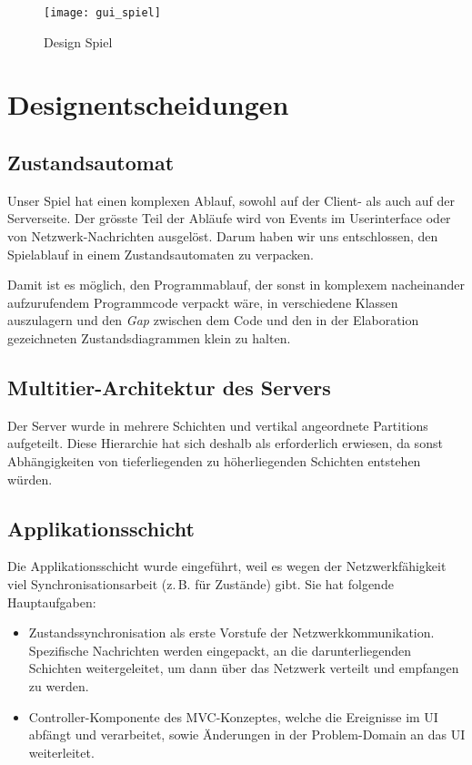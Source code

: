 \documentclass[12pt,halfparskip]{scrartcl}
\begin{document}
\begin{figure}[h]
	\centering
	\texttt{[image: gui\_spiel]}
	\caption{Design Spiel}
	\label{fig:gui_spiel}
\end{figure}


\clearpage
\section{Designentscheidungen}

\subsection{Zustandsautomat}
Unser Spiel hat einen komplexen Ablauf, sowohl auf der Client- als auch auf der Serverseite. Der grösste Teil der Abläufe wird von Events im Userinterface oder von Netzwerk-Nachrichten ausgelöst. Darum haben wir uns entschlossen, den Spielablauf in einem Zustandsautomaten zu verpacken.

Damit ist es möglich, den Programmablauf, der sonst in komplexem nacheinander aufzurufendem Programmcode verpackt wäre, in verschiedene Klassen auszulagern und den \emph{Gap} zwischen dem Code und den in der Elaboration gezeichneten Zustandsdiagrammen klein zu halten.

\subsection{Multitier-Architektur des Servers}
Der Server wurde in mehrere Schichten und vertikal angeordnete Partitions aufgeteilt. Diese Hierarchie hat sich deshalb als erforderlich erwiesen, da sonst Abhängigkeiten von tieferliegenden zu höherliegenden Schichten entstehen würden.

\subsection{Applikationsschicht}
Die Applikationsschicht wurde eingeführt, weil es wegen der Netzwerkfähigkeit viel Synchronisationsarbeit (z.\,B. für Zustände) gibt. Sie hat folgende Hauptaufgaben:
	\begin{itemize}
		\item Zustandssynchronisation als erste Vorstufe der Netzwerkkommunikation. Spezifische Nachrichten werden eingepackt, an die darunterliegenden Schichten weitergeleitet, um dann über das Netzwerk verteilt und empfangen zu werden.
		\item Controller-Komponente des MVC-Konzeptes, welche die Ereignisse im UI abfängt und verarbeitet, sowie Änderungen in der Problem-Domain an das UI weiterleitet.
	\end{itemize}
\end{document}
